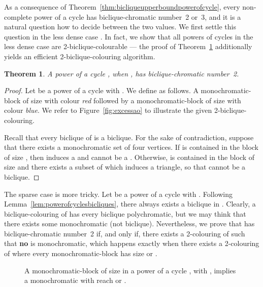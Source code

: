 \documentclass{article}
\newtheorem{theorem}{Theorem}
\begin{document}
As a consequence of Theorem~\ref{thm:bicliqueupperboundpowerofcycle}, every
non-complete power of a cycle has biclique-chromatic number~2 or~3, and it is a
natural question how to decide between the two values.
We first settle this question in the less dense case .
In fact, we show that all powers of cycles in the less dense case  are 2-biclique-colourable --- the proof of
Theorem~\ref{thm:kappabpowerofcyclesecondinterval} additionally yields an
efficient 2-biclique-colouring algorithm.

\begin{theorem}
\label{thm:kappabpowerofcyclesecondinterval}
 A power of a cycle , when , has
 biclique-chromatic number~2.
\end{theorem}

\begin{proof}
Let  be a power of a cycle  with . We
define  as follows. A monochromatic-block of
size  with colour \emph{red} followed by a monochromatic-block of size 
with colour \emph{blue}. We refer to Figure~\ref{fig:excessao} to illustrate the
given 2-biclique-colouring.

Recall that every biclique of  is a  biclique. For the sake of
contradiction, suppose that there exists a monochromatic set  of four
vertices. If  is contained in the block of size , then  induces a
 and cannot be a . Otherwise,  is contained in the block of size
 and there exists a subset of  which induces a triangle,
so that  cannot be a  biclique.
\end{proof}


The sparse case  is more tricky. Let  be a power of a cycle
 with . Following
Lemma~\ref{lem:powerofcyclesbicliques}, there always exists a  biclique in
. Clearly, a biclique-colouring of  has every  biclique
polychromatic, but we may think that there exists some monochromatic  (not
biclique). Nevertheless, we prove that  has biclique-chromatic number~2 if,
and only if, there exists a 2-colouring of  such that \textbf{no}  is
monochromatic, which happens exactly when there exists a 2-colouring of 
where every monochromatic-block has size  or .

\begin{figure}[t]
\centering
	\qquad
	\qquad
	\caption{A monochromatic-block of size  in a power of a cycle
	, with , implies a monochromatic  with reach
	 or .}
	\label{fig:catarinav2}
\end{figure}
\end{document}
